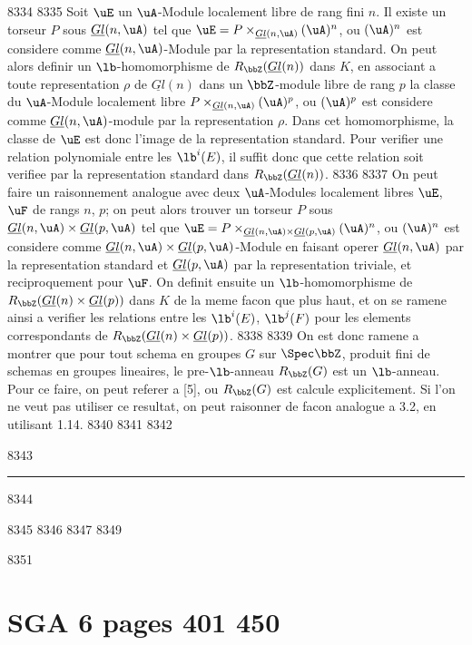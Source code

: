   8334	
  8335	Soit $\uE$ un $\uA$-Module localement libre de rang fini $n$. Il existe un torseur $P$ sous $\underline{Gl}(n, \uA)$ tel que $\uE = P \times_{\underline{Gl}(n,\uA)} (\uA)^n$, ou $(\uA)^n$ est considere comme $\underline{Gl}(n,\uA)$-Module par la representation standard. On peut alors definir un $\lb$-homomorphisme de $R_{\bbZ}(\underline{Gl}(n))$ dans $K$, en associant a toute representation $\rho$ de $\underline{Gl}(n)$ dans un $\bbZ$-module libre de rang $p$ la classe du $\uA$-Module localement libre $P \times_{\underline{Gl}(n,\uA)} (\uA)^p$, ou $(\uA)^p$ est considere comme $\underline{Gl}(n,\uA)$-module par la representation $\rho$. Dans cet homomorphisme, la classe de $\uE$ est donc l'image de la representation standard. Pour verifier une relation polynomiale entre les $\lb^i(E)$, il suffit donc que cette relation soit verifiee par la representation standard dans $R_{\bbZ}(\underline{Gl}(n))$.
  8336	
  8337	On peut faire un raisonnement analogue avec deux $\uA$-Modules localement libres $\uE$, $\uF$ de rangs $n$, $p$; on peut alors trouver un torseur $P$ sous $\underline{Gl}(n,\uA) \times \underline{Gl}(p,\uA)$ tel que $\uE = P \times_{\underline{Gl}(n,\uA)\times\underline{Gl}(p,\uA)} (\uA)^n$, ou $(\uA)^n$ est considere comme $\underline{Gl}(n,\uA)\times\underline{Gl}(p,\uA)$-Module en faisant operer $\underline{Gl}(n,\uA)$ par la representation standard et $\underline{Gl}(p,\uA)$ par la representation triviale, et reciproquement pour $\uF$. On definit ensuite un $\lb$-homomorphisme de $R_{\bbZ}(\underline{Gl}(n)\times\underline{Gl}(p))$ dans $K$ de la meme facon que plus haut, et on se ramene ainsi a verifier les relations entre les $\lb^i(E)$, $\lb^j(F)$ pour les elements correspondants de $R_{\bbZ}(\underline{Gl}(n)\times\underline{Gl}(p))$.
  8338	
  8339	On est donc ramene a montrer que pour tout schema en groupes $G$ sur $\Spec \bbZ$, produit fini de schemas en groupes lineaires, le pre-$\lb$-anneau $R_{\bbZ}(G)$ est un $\lb$-anneau. Pour ce faire, on peut referer a [5], ou $R_{\bbZ}(G)$ est calcule explicitement. Si l'on ne veut pas utiliser ce resultat, on peut raisonner de facon analogue a 3.2, en utilisant 1.14.
  8340	
  8341	\vspace{2em}
  8342	\begin{center}
  8343	\rule{0.5\textwidth}{0.5pt}
  8344	\end{center}
  8345	
  8346	
  8347		%
  8349		
  8351	\section*{SGA 6 pages 401 450}
